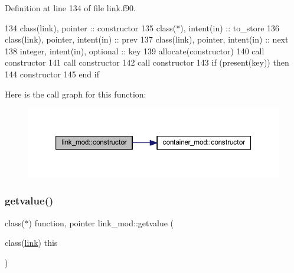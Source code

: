Definition at line 134 of file link.\+f90.


\begin{DoxyCode}
134     \textcolor{keywordtype}{class}(link), \textcolor{keywordtype}{pointer} :: constructor
135     \textcolor{keywordtype}{class}(*), \textcolor{keywordtype}{intent(in)} :: to\_store
136     \textcolor{keywordtype}{class}(link), \textcolor{keywordtype}{pointer}, \textcolor{keywordtype}{intent(in)} :: prev
137     \textcolor{keywordtype}{class}(link), \textcolor{keywordtype}{pointer}, \textcolor{keywordtype}{intent(in)} :: next
138     \textcolor{keywordtype}{integer}, \textcolor{keywordtype}{intent(in)}, \textcolor{keywordtype}{optional} :: key
139     \textcolor{keyword}{allocate}(constructor)
140     \textcolor{keyword}{call }constructor%
141     \textcolor{keyword}{call }constructor%
142     \textcolor{keyword}{call }constructor%
143     \textcolor{keywordflow}{if} (\textcolor{keyword}{present}(key)) \textcolor{keywordflow}{then}
144         constructor%
145 \textcolor{keywordflow}{    end if}
\end{DoxyCode}
Here is the call graph for this function\+:\nopagebreak
\begin{figure}[H]
\begin{center}
\leavevmode
\includegraphics[width=350pt]{namespacelink__mod_ac5b4f1702d8edb10a4559f6f371dc797_cgraph}
\end{center}
\end{figure}
\mbox{\label{namespacelink__mod_aa2c8d19ee91797e19464fc7589cc2c39}} 
\subsubsection{\texorpdfstring{getvalue()}{getvalue()}}
{\footnotesize\ttfamily class($\ast$) function, pointer link\+\_\+mod\+::getvalue (\begin{DoxyParamCaption}\item[{class(\mbox{\hyperlink{structlink__mod_1_1link}{link}})}]{this }\end{DoxyParamCaption})\hspace{0.3cm}{\ttfamily [private]}}



